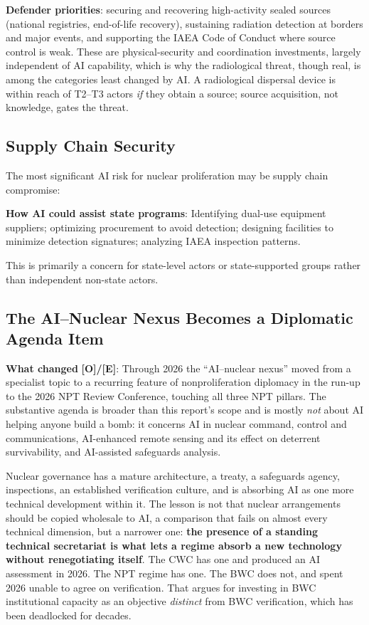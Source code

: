 \documentclass[11pt,letterpaper]{article}
\begin{document}
\textbf{Defender priorities}: securing and recovering high-activity sealed sources (national registries, end-of-life recovery), sustaining radiation detection at borders and major events, and supporting the IAEA Code of Conduct where source control is weak. These are physical-security and coordination investments, largely independent of AI capability, which is why the radiological threat, though real, is among the categories least changed by AI. A radiological dispersal device is within reach of T2--T3 actors \textit{if} they obtain a source; source acquisition, not knowledge, gates the threat.

\subsection{Supply Chain Security}

The most significant AI risk for nuclear proliferation may be supply chain compromise:

\textbf{How AI could assist state programs}: Identifying dual-use equipment suppliers; optimizing procurement to avoid detection; designing facilities to minimize detection signatures; analyzing IAEA inspection patterns.

This is primarily a concern for state-level actors or state-supported groups rather than independent non-state actors.

\subsection{The AI--Nuclear Nexus Becomes a Diplomatic Agenda Item}

\textbf{What changed} \textbf{[O]/[E]}: Through 2026 the ``AI--nuclear nexus'' moved from a specialist topic to a recurring feature of nonproliferation diplomacy in the run-up to the 2026 NPT Review Conference, touching all three NPT pillars. The substantive agenda is broader than this report's scope and is mostly \textit{not} about AI helping anyone build a bomb: it concerns AI in nuclear command, control and communications, AI-enhanced remote sensing and its effect on deterrent survivability, and AI-assisted safeguards analysis.

\begin{keybox}
Nuclear governance has a mature architecture, a treaty, a safeguards agency, inspections, an established verification culture, and is absorbing AI as one more technical development within it. The lesson is not that nuclear arrangements should be copied wholesale to AI, a comparison that fails on almost every technical dimension, but a narrower one: \textbf{the presence of a standing technical secretariat is what lets a regime absorb a new technology without renegotiating itself}. The CWC has one and produced an AI assessment in 2026. The NPT regime has one. The BWC does not, and spent 2026 unable to agree on verification. That argues for investing in BWC institutional capacity as an objective \textit{distinct} from BWC verification, which has been deadlocked for decades.
\end{keybox}
\end{document}
